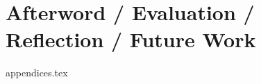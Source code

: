 \documentclass[a4paper,11pt,twoside]{report}
\begin{document}
\chapter{Afterword / Evaluation / Reflection / Future Work}


\clearpage





{appendices.tex}
\end{document}
